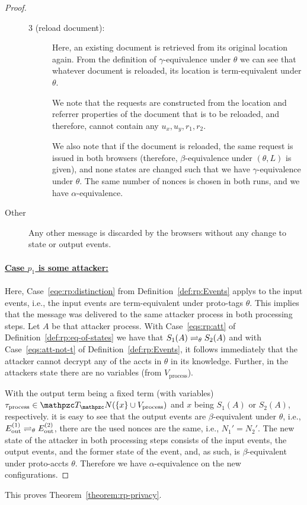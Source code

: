 \begin{proof}
\begin{description}
\begin{description}
          \item[3 (reload document):]
            Here, an existing document is retrieved from its original location again. 
            From the definition of $\gamma$-equivalence under $\theta$ we can see that
            whatever document is reloaded, its location is term-equivalent under $\theta$.
      
            We note that the requests are constructed from
            the location and referrer properties of the document that is to
            be reloaded, and therefore, cannot contain any $u_x, u_y, r_1, r_2$.
      
            We also note that if the document is reloaded, the same 
            request is issued in both browsers (therefore,
            $\beta$-equivalence under $(\theta, L)$ is given), and 
            none states are changed such that we have
            $\gamma$-equivalence under $\theta$. The same number of
            nonces is chosen in both runs, and we have $\alpha$-equivalence.
        \end{description}
      \item[Other] Any other message is discarded by the browsers without any change to state or output events.
    \end{description}
  
    \paragraph{\underline{Case $p_1$ is some attacker:}}
    
    Here, Case~\ref{eqe:rp:distinction} from 
    Definition~\ref{def:rp:Events} applys to the input events,
    i.e., the input events are term-equivalent under proto-tags
    $\theta$. This implies that the message was delivered to the 
    same attacker process in both processing steps. Let $A$ be 
    that attacker process. With Case~\ref{eqs:rp:att} of 
    Definition~\ref{def:rp:eq-of-states} we have that 
    $S_1(A) \rightleftharpoons_{\theta} S_2(A)$ and with 
    Case~\ref{eqs:att-not-t} of Definition~\ref{def:rp:Events},  
    it follows immediately that the attacker cannot decrypt any 
    of the accts in $\theta$ in its knowledge. Further, in the 
    attackers state there are no variables (from $V_\text{process}$). 
  
    With the output term being a fixed term (with variables)
    $\tau_{\text{process}} \in \terms(\{x\} \cup V_\text{process})$ 
    and $x$ being $S_1(A)$ or $S_2(A)$, respectively. 
    it is easy to see that the output events are 
    $\beta$-equivalent under $\theta$, i.e., 
    $E ^{(1)}_\text{out} \rightleftharpoons_{\theta} E^{(2)}_\text{out}$, there
    are the used nonces are the same, i.e., $N_1' = N_2'$. 
    The new state of the attacker in both processing steps 
    consists of the input events, the output events, and the 
    former state of the event, and, as such, is 
    $\beta$-equivalent under proto-accts $\theta$. 
    Therefore we have $\alpha$-equivalence on the new configurations.
  \end{proof}
  
  This proves Theorem~\ref{theorem:rp-privacy}.\QED
  
  
  